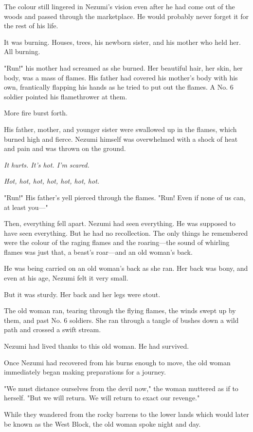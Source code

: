 The colour still lingered in Nezumi's vision even after he had come out
of the woods and passed through the marketplace. He would probably never
forget it for the rest of his life.

It was burning. Houses, trees, his newborn sister, and his mother who
held her. All burning.

"Run!" his mother had screamed as she burned. Her beautiful hair, her
skin, her body, was a mass of flames. His father had covered his
mother's body with his own, frantically flapping his hands as he tried
to put out the flames. A No. 6 soldier pointed his flamethrower at them.

More fire burst forth.

His father, mother, and younger sister were swallowed up in the flames,
which burned high and fierce. Nezumi himself was overwhelmed with a
shock of heat and pain and was thrown on the ground.

\emph{It hurts. It's hot. I'm scared.}

\emph{Hot, hot, hot, hot, hot, hot, hot.}

"Run!" His father's yell pierced through the flames. "Run! Even if none
of us can, at least you---"

Then, everything fell apart. Nezumi had seen everything. He was supposed
to have seen everything. But he had no recollection. The only things he
remembered were the colour of the raging flames and the roaring---the
sound of whirling flames was just that, a beast's roar---and an old
woman's back.

He was being carried on an old woman's back as she ran. Her back was
bony, and even at his age, Nezumi felt it very small.

But it was sturdy. Her back and her legs were stout.

The old woman ran, tearing through the flying flames, the winds swept up
by them, and past No. 6 soldiers. She ran through a tangle of bushes
down a wild path and crossed a swift stream.

Nezumi had lived thanks to this old woman. He had survived.

Once Nezumi had recovered from his burns enough to move, the old woman
immediately began making preparations for a journey.

"We must distance ourselves from the devil now," the woman muttered as
if to herself. "But we will return. We will return to exact our
revenge."

While they wandered from the rocky barrens to the lower lands which
would later be known as the West Block, the old woman spoke night and
day.

